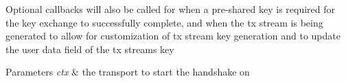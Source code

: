 Optional callbacks will also be called for when a pre-\/shared key is required for the key exchange to successfully complete, and when the tx stream is being generated to allow for customization of tx stream key generation and to update the user data field of the tx stream\textquotesingle{}s key


\begin{DoxyParams}{Parameters}
{\em ctx} & the transport to start the handshake on \\
\hline
\end{DoxyParams}
